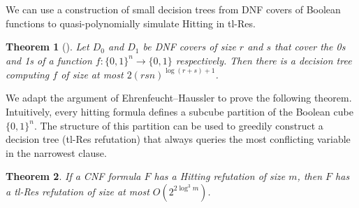 \documentclass[11pt]{article}
\newcommand{\scterm}[1]{{\textrm{\sc #1}}}
\newcommand{\hit}{\scterm{Hitting}}
\newcommand{\tres}{\scterm{tl-Res}}
\numberwithin{equation}{section}
\newtheorem{theorem}{Theorem}[section]
\begin{document}
We can use a construction of small decision trees from DNF covers of Boolean functions to quasi-polynomially simulate {\hit} in {\tres}.

\begin{theorem}[\cite{EhrenfeuchtHaussler}] \label{th:eh}
  Let $D_0$ and $D_1$ be DNF covers of size $r$ and $s$ that cover the 0s and 1s of a function $f\colon\{0,1\}^n\to \{0,1\}$  respectively. Then there is a decision tree computing $f$ of size at most $2(rsn)^{\log(r+s)+1}$.
\end{theorem}




We adapt the argument of Ehrenfeucht--Haussler to prove the following theorem.
Intuitively, every hitting formula defines a subcube partition of the Boolean cube $\{0,1\}^n$. The structure of this partition can be used to greedily construct a decision tree ({\tres} refutation) that always queries the most conflicting variable in the narrowest clause. 

\begin{theorem}\label{th:tres-qsim-hit} If a CNF formula $F$ has a {\hit} refutation of size $m$, then $F$ has a {\tres} refutation of size at most $O(2^{2\log^3 m})$.
\end{theorem}
\end{document}
